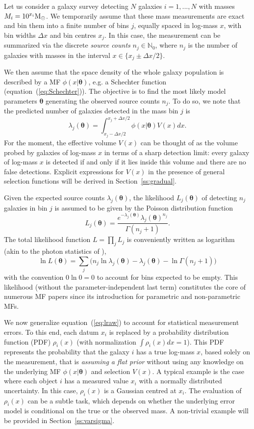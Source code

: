 \documentclass[a4paper,fleqn,usenatbib]{mnras}
\newcommand{\be}{\begin{equation}}
\newcommand{\ee}{\end{equation}}
\newcommand{\msun}{{\rm M}_{\odot}}
\newcommand{\Dx}{\Delta x}
\newcommand{\dx}{dx}
\newcommand{\veff}{V}%
\newcommand{\eq}[1]{equation~(\ref{eq:#1})}
\renewcommand{\ss}[1]{Section~\ref{ss:#1}}
\newcommand{\eg}{e.g.\xspace}
\newcommand{\para}{{\bm{\theta}}}
\begin{document}
Let us consider a galaxy survey detecting $N$ galaxies $i=1,...,N$ with masses $M_i=10^{x_i}\msun$. We temporarily assume that these mass measurements are exact and bin them into a finite number of bins $j$, equally spaced in log-mass $x$, with bin widths $\Dx$ and bin centres $x_j$. In this case, the measurement can be summarized via the discrete \textit{source counts} $n_j\in\mathbb{N}_0$, where $n_j$ is the number of galaxies with masses in the interval $x\in\{x_j\pm\Dx/2\}$.

We then assume that the space density of the whole galaxy population is described by a MF $\phi(x|\para)$, \eg a Schechter function (\eq{Schechter}). The objective is to find the most likely model parameters $\para$ generating the observed source counts $n_j$. To do so, we note that the predicted number of galaxies detected in the mass bin $j$ is
\be\label{eq:expectednb}
	\lambda_j(\para) = \int_{x_j-\Dx/2}^{x_j+\Dx/2}\phi(x|\para)\veff(x)\dx.
\ee
%
For the moment, the effective volume $\veff(x)$ can be thought of as the volume probed by galaxies of log-mass $x$ in terms of a sharp detection limit: every galaxy of log-mass $x$ is detected if and only if it lies inside this volume and there are no false detections. Explicit expressions for $\veff(x)$ in the presence of general selection functions will be derived in \ss{gradual}.

Given the expected source counts $\lambda_j(\para)$, the likelihood $L_j(\para)$ of detecting $n_j$ galaxies in bin $j$ is assumed to be given by the Poisson distribution function
\be
	L_j(\para) = \frac{e^{-\lambda_j(\para)}\lambda_j(\para)^{n_j}}{\Gamma(n_j+1)}.
\ee
The total likelihood function $L=\prod_j L_j$ is conveniently written as logarithm (akin to the photon statistics of \citealp{Cash1979}),
\be\label{eq:lraw}
	\ln L(\para) = \sum_j\big(n_j\ln\lambda_j(\para)-\lambda_j(\para)-\ln\Gamma(n_j+1)\big)
\ee
with the convention $0\ln0=0$ to account for bins expected to be empty. This likelihood (without the parameter-independent last term) constitutes the core of numerous MF papers since its introduction for parametric \citep{Sandage1979} and non-parametric \citep{Efstathiou1988} MFs.

We now generalize \eq{lraw} to account for statistical measurement errors. To this end, each datum $x_i$ is replaced by a probability distribution function (PDF) $\rho_i(x)$ (with normalization $\int\rho_i(x)\dx=1$). This PDF represents the probability that the galaxy $i$ has a true log-mass $x$, based solely on the measurement, that is \emph{assuming a flat prior} without using any knowledge on the underlying MF $\phi(x|\para)$ and selection $\veff(x)$. A typical example is the case where each object $i$ has a measured value $x_i$ with a normally distributed uncertainty. In this case, $\rho_i(x)$ is a Gaussian centred at $x_i$. The evaluation of $\rho_i(x)$ can be a subtle task, which depends on whether the underlying error model is conditional on the true or the observed mass. A non-trivial example will be provided in \ss{varsigma}.
\end{document}
